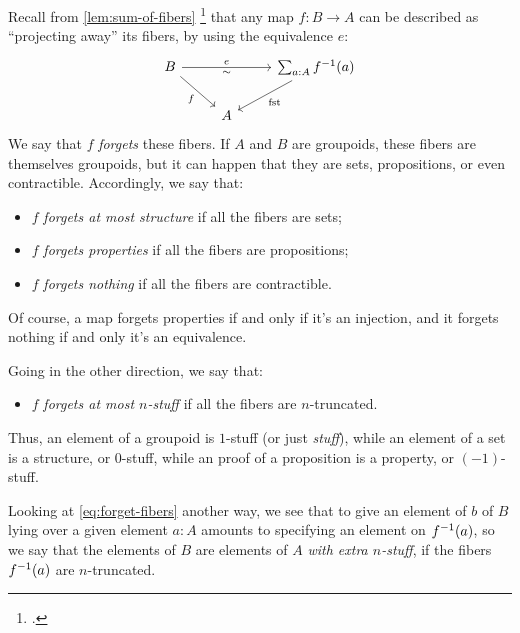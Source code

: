 Recall from \cref{lem:sum-of-fibers}%
\footcitetext{Baez-Shulman}
that any map $f : B \to A$ can be described
as ``projecting away'' its fibers,
by using the equivalence $e$:
\begin{equation}\label{eq:forget-fibers}
  \begin{tikzcd}
    B \ar[rr,"e","\sim"']\ar[dr,"f"'] & &
    \sum_{a:A} \inv f(a)\ar[dl,"\fst"] \\
    & A &
  \end{tikzcd}
\end{equation}
We say that $f$ \emph{forgets} these fibers.
If $A$ and $B$ are groupoids,
these fibers are themselves groupoids,
but it can happen that they are sets, propositions, or even contractible.
Accordingly, we say that:
\begin{itemize}
\item $f$ \emph{forgets at most structure} if all the fibers are sets;%
\item $f$ \emph{forgets properties} if all the fibers are propositions;%
\item $f$ \emph{forgets nothing} if all the fibers are contractible.
\end{itemize}
Of course, a map forgets properties if and only if
it's an injection,
and it forgets nothing if and only it's an equivalence.

Going in the other direction,
we say that:
\begin{itemize}
\item $f$ \emph{forgets at most $n$-stuff}
  if all the fibers are $n$-truncated.
\end{itemize}
Thus, an element of a groupoid is $1$-stuff
(or just \emph{stuff}),
while an element of a set is a structure, or $0$-stuff,
while an proof of a proposition is a property, or $(-1)$-stuff.

Looking at \eqref{eq:forget-fibers} another way,
we see that to give an element of $b$ of $B$ lying
over a given element $a:A$ amounts to
specifying an element on $f^{-1}(a)$,
so we say that the elements of $B$
are elements of $A$ \emph{with extra $n$-stuff},
if the fibers $f^{-1}(a)$ are $n$-truncated.

